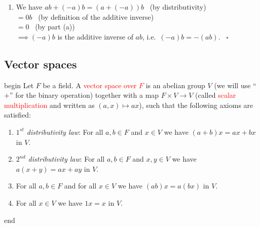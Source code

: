 \documentclass[
  12pt,
  a4paper,
  twoside]{article}
\providecommand{\tightlist}{%
  \setlength{\itemsep}{0pt}\setlength{\parskip}{0pt}}
\theoremstyle{plain}
\theoremstyle{definition}
\begin{document}
\begin{enumerate}
\def\labelenumi{(\alph{enumi})}
\setcounter{enumi}{1}
\tightlist
\item
  We have \(ab + (-a)b = (a + (-a))b\) \hfill~{(by distributivity)}\\
  \hspace*{0.333em}\hspace*{0.333em}\hspace*{0.333em}\hspace*{0.333em}\(= 0b\) \hfill~{(by definition of the additive inverse)}\\
  \hspace*{0.333em}\hspace*{0.333em}\hspace*{0.333em}\hspace*{0.333em}\(= 0\) \hfill~{(by part (a))}\\
  \(\implies (-a)b\) is the additive inverse of \(ab\), i.e.~\((-a)b = -(ab)\).
  \hfill~{\(\square\)}
\end{enumerate}

\hypertarget{ss-vector-spaces}{%
\subsection{Vector spaces}\label{ss-vector-spaces}}

\csname begin\label{cnj:defn-vectorspace}
Let \(F\) be a field. A \textcolor{red}{vector space over $F$} is an abelian group \(V\) (we will use ``\(+\)'' for the binary operation) together with a map \(F \times V \to V\) (called \textcolor{red}{scalar multiplication} and written as \((a,x) \mapsto ax\)), such that the following axioms are satisfied:

\begin{enumerate}
\def\labelenumi{(\roman{enumi})}
\tightlist
\item
  \emph{\(1^{st}\) distributivity law}: For all \(a,b \in F\) and \(x \in V\) we have \((a + b)x = ax + bx\) in \(V\).
\item
  \emph{\(2^{nd}\) distributivity law}: For all \(a,b \in F\) and \(x,y \in V\) we have \(a(x + y) = ax + ay\) in \(V\).
\item
  For all \(a, b \in F\) and for all \(x \in V\) we have \((ab)x = a(bx)\) in \(V\).
\item
  For all \(x \in V\) we have \(1x = x\) in \(V\).
\end{enumerate}

\csname end
\end{document}
